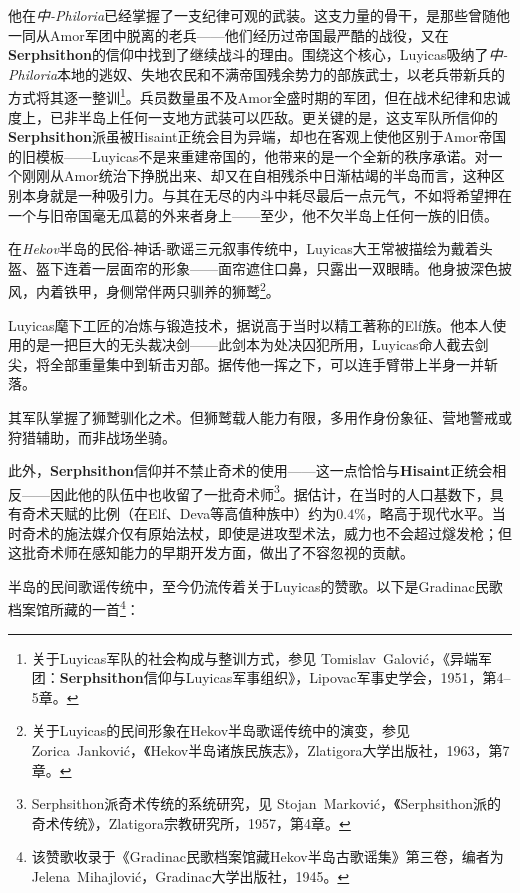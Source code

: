 他在\textit{中-Philoria}已经掌握了一支纪律可观的武装。这支力量的骨干，是那些曾随他一同从Amor军团中脱离的老兵——他们经历过帝国最严酷的战役，又在\textbf{Serphsithon}的信仰中找到了继续战斗的理由。围绕这个核心，Luyicas吸纳了\textit{中-Philoria}本地的逃奴、失地农民和不满帝国残余势力的部族武士，以老兵带新兵的方式将其逐一整训\footnote{关于Luyicas军队的社会构成与整训方式，参见 Tomislav~Galović，《异端军团：\textbf{Serphsithon}信仰与Luyicas军事组织》，Lipovac军事史学会，1951，第4--5章。}。兵员数量虽不及Amor全盛时期的军团，但在战术纪律和忠诚度上，已非半岛上任何一支地方武装可以匹敌。更关键的是，这支军队所信仰的\textbf{Serphsithon}派虽被Hisaint正统会目为异端，却也在客观上使他区别于Amor帝国的旧模板——Luyicas不是来重建帝国的，他带来的是一个全新的秩序承诺。对一个刚刚从Amor统治下挣脱出来、却又在自相残杀中日渐枯竭的半岛而言，这种区别本身就是一种吸引力。与其在无尽的内斗中耗尽最后一点元气，不如将希望押在一个与旧帝国毫无瓜葛的外来者身上——至少，他不欠半岛上任何一族的旧债。

在\textit{Hekov}半岛的民俗-神话-歌谣三元叙事传统中，Luyicas大王常被描绘为戴着头盔、盔下连着一层面帘的形象——面帘遮住口鼻，只露出一双眼睛。他身披深色披风，内着铁甲，身侧常伴两只驯养的狮鹫\footnote{关于Luyicas的民间形象在Hekov半岛歌谣传统中的演变，参见 Zorica~Janković，《Hekov半岛诸族民族志》，Zlatigora大学出版社，1963，第7章。}。

Luyicas麾下工匠的冶炼与锻造技术，据说高于当时以精工著称的Elf族。他本人使用的是一把巨大的无头裁决剑——此剑本为处决囚犯所用，Luyicas命人截去剑尖，将全部重量集中到斩击刃部。据传他一挥之下，可以连手臂带上半身一并斩落。

其军队掌握了狮鹫驯化之术。但狮鹫载人能力有限，多用作身份象征、营地警戒或狩猎辅助，而非战场坐骑。

此外，\textbf{Serphsithon}信仰并不禁止奇术的使用——这一点恰恰与\textbf{Hisaint}正统会相反——因此他的队伍中也收留了一批奇术师\footnote{Serphsithon派奇术传统的系统研究，见 Stojan~Marković，《Serphsithon派的奇术传统》，Zlatigora宗教研究所，1957，第4章。}。据估计，在当时的人口基数下，具有奇术天赋的比例（在Elf、Deva等高值种族中）约为$0.4\%$，略高于现代水平。当时奇术的施法媒介仅有原始法杖，即使是进攻型术法，威力也不会超过燧发枪；但这批奇术师在感知能力的早期开发方面，做出了不容忽视的贡献。

半岛的民间歌谣传统中，至今仍流传着关于Luyicas的赞歌。以下是Gradinac民歌档案馆所藏的一首\footnote{该赞歌收录于《Gradinac民歌档案馆藏Hekov半岛古歌谣集》第三卷，编者为 Jelena~Mihajlović，Gradinac大学出版社，1945。}：

